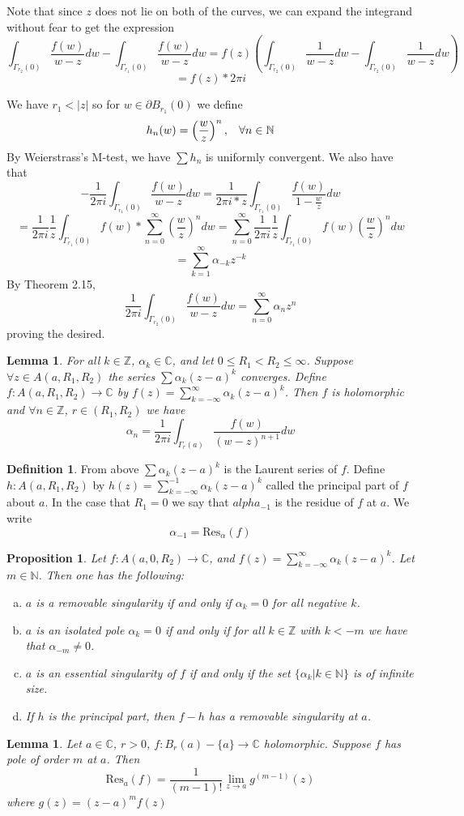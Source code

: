 \documentclass[11pt]{article}
\theoremstyle{plain}
\newtheorem{lemma}[theorem]{Lemma}
\newtheorem{proposition}[theorem]{Proposition}
\theoremstyle{definition}
\newtheorem{definition}[theorem]{Definition}
\newcommand{\C}{\mathbb{C}}
\newcommand{\Z}{\mathbb{Z}}
\begin{document}
Note that since $z$ does not lie on both of the curves, we can expand the integrand without fear to get the expression
$$ \int_{\Gamma_{r_2}(0)} \frac{f(w)}{w-z} dw - \int_{\Gamma_{r_1}(0)} \frac{f(w)}{w - z} dw = f(z) \left( \int_{\Gamma_{r_2}(0)} \frac{1}{w-z} dw - \int_{\Gamma_{r_2}(0)} \frac{1}{w-z}dw \right) $$
$$ = f(z) * 2\pi i $$

We have $r_1 < |z|$ so for $w \in \partial B_{r_1}(0)$ we define 
$$ h_n(w) = \left(\frac{w}{z}\right)^n, \hspace{3mm} \forall n \in \mathbb{N} $$ 
By Weierstrass's M-test, we have $\sum h_n$ is uniformly convergent. We also have that 
$$ -\frac{1}{2\pi i} \int_{\Gamma_{r_1}(0)} \frac{f(w)}{w-z}dw = \frac{1}{2\pi i * z} \int_{\Gamma_{r_1}(0)} \frac{f(w)}{1 - \frac{w}{z}} dw $$
$$ = \frac{1}{2\pi i} \frac{1}{z} \int_{\Gamma_{r_1}(0)} f(w) * \sum_{n=0}^{\infty} \left(\frac{w}{z}\right)^n dw  = \sum_{n=0}^\infty \frac{1}{2\pi i} \frac{1}{z} \int_{\Gamma_{r_1}(0)} f(w) \left(\frac{w}{z}\right)^n dw $$
$$ = \sum_{k=1}^\infty \alpha_{-k} z^{-k} $$
By Theorem 2.15, 
$$ \frac{1}{2\pi i} \int_{\Gamma_{r_2}(0)} \frac{f(w)}{w-z} dw = \sum_{n=0}^\infty \alpha_n z^n $$
proving the desired.

\begin{lemma}
For all $k \in \Z$, $\alpha_k \in \C$, and let $0 \leq R_1 < R_2 \leq \infty$. Suppose $\forall z \in A(a, R_1, R_2)$ the series $\sum \alpha_k (z - a)^k$ converges. Define $f: A(a, R_1, R_2) \to \C$ by $f(z) = \sum_{k=-\infty}^\infty \alpha_k(z-a)^k$. Then $f$ is holomorphic and $\forall n \in \Z$, $r \in (R_1, R_2)$ we have 
$$ \alpha_n = \frac{1}{2\pi i} \int_{\Gamma_r(a)} \frac{f(w)}{(w-z)^{n+1}} dw $$
\end{lemma}

\begin{definition}
From above $\sum \alpha_k (z-a)^k$ is the Laurent series of $f$. Define $h: A(a, R_1, R_2)$ by $h(z) = \sum_{k=-\infty}^{-1} \alpha_k (z - a)^k$ called the principal part of $f$ about $a$. In the case that $R_1 = 0$ we say that $alpha_{-1}$ is the residue of $f$ at $a$.
We write 
$$ \alpha_{-1} = \text{Res}_\alpha(f) $$
\end{definition}

\begin{proposition}
Let $f:A(a, 0, R_2) \to \C$, and $f(z) = \sum_{k=-\infty}^\infty \alpha_k(z-a)^k$. Let $m \in \mathbb{N}$. Then one has the following:
\begin{enumerate}[(a)]
\item $a$ is a removable singularity if and only if $\alpha_k = 0$ for all negative $k$.
\item $a$ is an isolated pole $\alpha_k = 0$ if and only if for all $k \in \Z$ with $k < -m$ we have that $\alpha_{-m} \neq 0$.
\item $a$ is an essential singularity of $f$ if and only if the set $\{ \alpha_k | k \in \mathbb{N} \}$ is of infinite size. 
\item If $h$ is the principal part, then $f - h$ has a removable singularity at $a$.
\end{enumerate}
\end{proposition}

\begin{lemma}
Let $a \in \C$, $r > 0$, $f: B_r(a) - \{ a \} \to \C$ holomorphic. Suppose $f$ has pole of order $m$ at $a$. Then 
$$ \text{Res}_a(f) = \frac{1}{(m-1)!} \lim_{z \to a} g^{(m-1)}(z) $$
where $g(z) = (z - a)^m f(z) $
\end{lemma}
\end{document}
